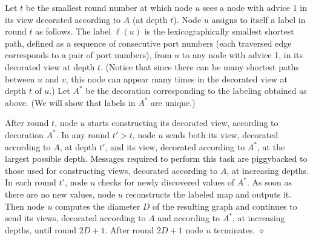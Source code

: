 \documentclass{article}
\newcommand{\procend}{\hfill $\diamond$\medskip}
\begin{document}
Let $t$ be the smallest round number at which node $u$ sees a node with advice $1$ in its view decorated according to $A$  (at depth $t$).
Node $u$ assigns to itself a label in round $t$ as follows.
The label $\ell(u)$ is the lexicographically smallest shortest path, defined as a sequence of consecutive port numbers  (each traversed edge corresponds to a pair of port numbers), from $u$ to any node with advice 1, in its decorated view at depth $t$.
(Notice that since there can be many shortest paths between $u$ and $v$, this node can appear many times in the decorated view at depth $t$ of $u$.)
Let $A^*$ be the decoration corresponding to the labeling  obtained as above.
(We will show that labels in $A^*$ are unique.)

After round $t$, node $u$ starts constructing its decorated view, according to decoration $A^*$. 
In any round $t' >t$, node $u$ sends both its view, decorated according to $A$, at depth $t'$, and its view, decorated according to $A^*$, at the largest possible depth. Messages required to perform this task are piggybacked to those used for constructing views, decorated according to $A$, at increasing depths.
In each round $t'$, node $u$ checks for newly discovered values of $A^*$.
As soon as there are no new values, node $u$ reconstructs the labeled map and outputs it.
Then node $u$ computes the diameter $D$ of the resulting graph and continues to send its views, decorated according to $A$ and according to  $A^*$, at increasing depths, until round $2D+1$.  After round $2D+1$ node $u$ terminates.
\procend
\end{document}

